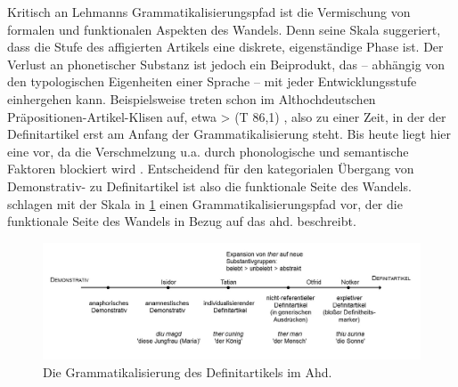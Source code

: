Kritisch an Lehmanns Grammatikalisierungspfad ist die Vermischung von formalen und funktionalen Aspekten des Wandels. Denn seine Skala suggeriert, dass die Stufe des affigierten Artikels eine diskrete, eigenständige Phase ist. Der Verlust an phonetischer Substanz ist jedoch ein Beiprodukt, das -- abhängig von den typologischen Eigenheiten einer Sprache \parencite[vgl.][33]{Himmelmann2004} -- mit jeder Entwicklungsstufe einhergehen kann. Beispielsweise treten schon im  Althochdeutschen Präpositionen-Artikel-Klisen auf, etwa  >   (T 86,1) \parencite{Schlachter2015}, also zu einer Zeit, in der der Definitartikel erst am Anfang der Grammatikalisierung steht. Bis heute liegt hier eine    \parencite{Nubling1992,Nubling2005} vor, da die Verschmelzung u.a. durch phonologische und semantische Faktoren blockiert wird \parencite[s. auch][91]{Szczepaniak2011a}.
Entscheidend für den kategorialen Übergang von Demonstrativ- zu Definitartikel ist also die funktionale Seite des Wandels. \textcite{Schmuck2014} schlagen mit der Skala in  \ref{abb:schmuckszczep} \parencite[aufbauend auf][]{Lyons1999,Szczepaniak2011a} einen Grammatikalisierungspfad vor, der die funktionale Seite des Wandels in Bezug auf das ahd.   beschreibt. 

 \begin{figure}
\begin{center}
  \includegraphics[width=12cm]{images/Grammatikalisierungspfad-schmuck-szczepaniak.jpg}
\caption {Die Grammatikalisierung des Definitartikels im Ahd. \parencite[102]{Schmuck2014}}
\label{abb:schmuckszczep}
\end{center}
\end{figure}

